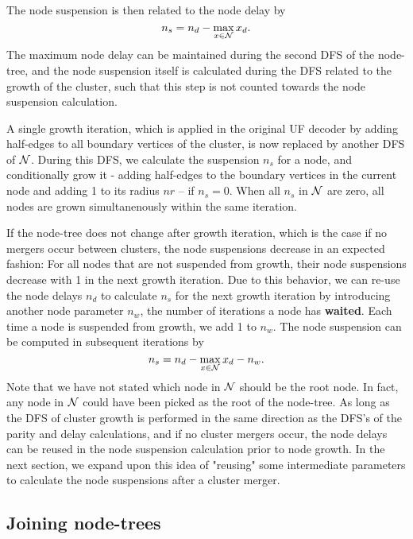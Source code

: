 The node suspension is then related to the node delay by
\begin{equation*}
    n_s = n_d - \max_{x \in \mathcal{N}}{x_d}. 
\end{equation*}
The maximum node delay can be maintained during the second DFS of the node-tree, and the node suspension itself is calculated during the DFS related to the growth of the cluster, such that this step is not counted towards the node suspension calculation. 

A single growth iteration, which is applied in the original UF decoder by adding half-edges to all boundary vertices of the cluster, is now replaced by another DFS of $\mathcal{N}$. During this DFS, we calculate the suspension $n_s$ for a node, and conditionally grow it - adding half-edges to the boundary vertices in the current node and adding 1 to its radius $nr$ -- if $n_s = 0$. When all $n_s$ in $\mathcal{N}$ are zero, all nodes are grown simultanenously within the same iteration. 

If the node-tree does not change after growth iteration, which is the case if no mergers occur between clusters, the node suspensions decrease in an expected fashion: For all nodes that are not suspended from growth, their node suspensions decrease with 1 in the next growth iteration. Due to this behavior, we can re-use the node delays $n_d$ to calculate $n_s$ for the next growth iteration by introducing another node parameter $n_w$, the number of iterations a node has \textbf{waited}. Each time a node is suspended from growth, we add 1 to $n_w$. The node suspension can be computed in subsequent iterations by
\begin{equation}\label{eq:suspension}
    n_s = n_d - \max_{x \in \nset}{x_d} - n_w. 
\end{equation}
Note that we have not stated which node in $\mathcal{N}$ should be the root node. In fact, any node in $\mathcal{N}$ could have been picked as the root of the node-tree. As long as the DFS of cluster growth is performed in the same direction as the DFS's of the parity and delay calculations, and if no cluster mergers occur, the node delays can be reused in the node suspension calculation prior to node growth. In the next section, we expand upon this idea of "reusing" some intermediate parameters to calculate the node suspensions after a cluster merger.  


\subsection{Joining node-trees}\label{sec:nodejoin}


